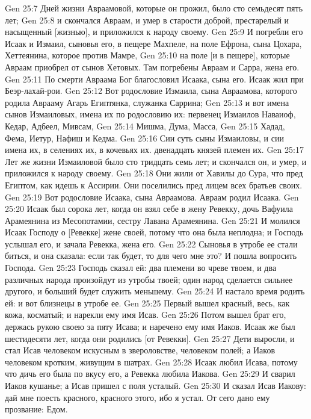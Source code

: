 \vs Gen 25:7 Дней жизни Авраамовой, которые он прожил, было сто семьдесят пять лет;
\vs Gen 25:8 и скончался Авраам, и умер в старости доброй, престарелый и насыщенный [жизнью], и приложился к народу своему.
\vs Gen 25:9 И погребли его Исаак и Измаил, сыновья его, в пещере Махпеле, на поле Ефрона, сына Цохара, Хеттеянина, которое против Мамре,
\vs Gen 25:10 на поле [и в пещере], которые Авраам приобрел от сынов Хетовых. Там погребены Авраам и Сарра, жена его.
\vs Gen 25:11 По смерти Авраама Бог благословил Исаака, сына его. Исаак жил при Беэр-лахай-рои.
\vs Gen 25:12 Вот родословие Измаила, сына Авраамова, которого родила Аврааму Агарь Египтянка, служанка Саррина;
\vs Gen 25:13 и вот имена сынов Измаиловых, имена их по родословию их: первенец Измаилов Наваиоф,  Кедар, Адбеел, Мивсам,
\vs Gen 25:14 Мишма, Дума, Масса,
\vs Gen 25:15 Хадад, Фема, Иетур, Нафиш и Кедма.
\vs Gen 25:16 Сии суть сыны Измаиловы, и сии имена их, в селениях их, в кочевьях их.  двенадцать князей племен их.
\vs Gen 25:17 Лет же жизни Измаиловой было сто тридцать семь лет; и скончался он, и умер, и приложился к народу своему.
\vs Gen 25:18 Они жили от Хавилы до Сура, что пред Египтом, как идешь к Ассирии. Они поселились пред лицем всех братьев своих.
\rsbpar\vs Gen 25:19 Вот родословие Исаака, сына Авраамова. Авраам родил Исаака.
\vs Gen 25:20 Исаак был сорока лет, когда он взял себе в жену Ревекку, дочь Вафуила Арамеянина из Месопотамии, сестру Лавана Арамеянина.
\vs Gen 25:21 И молился Исаак Господу о [Ревекке] жене своей, потому что она была неплодна; и Господь услышал его, и зачала Ревекка, жена его.
\vs Gen 25:22 Сыновья в утробе ее стали биться, и она сказала: если так будет, то для чего мне это? И пошла вопросить Господа.
\vs Gen 25:23 Господь сказал ей: два племени во чреве твоем, и два различных народа произойдут из утробы твоей; один народ сделается сильнее другого, и больший будет служить меньшему.
\vs Gen 25:24 И настало время родить ей: и вот близнецы в утробе ее.
\vs Gen 25:25 Первый вышел красный, весь, как кожа, косматый; и нарекли ему имя Исав.
\vs Gen 25:26 Потом вышел брат его, держась рукою своею за пяту Исава; и наречено ему имя Иаков. Исаак же был шестидесяти лет, когда они родились [от Ревекки].
\rsbpar\vs Gen 25:27 Дети выросли, и стал Исав человеком искусным в звероловстве, человеком полей; а Иаков человеком кротким, живущим в шатрах.
\vs Gen 25:28 Исаак любил Исава, потому что дичь его была по вкусу его, а Ревекка любила Иакова.
\vs Gen 25:29 И сварил Иаков кушанье; а Исав пришел с поля усталый.
\vs Gen 25:30 И сказал Исав Иакову: дай мне поесть красного, красного этого, ибо я устал. От сего дано ему прозвание: Едом.
